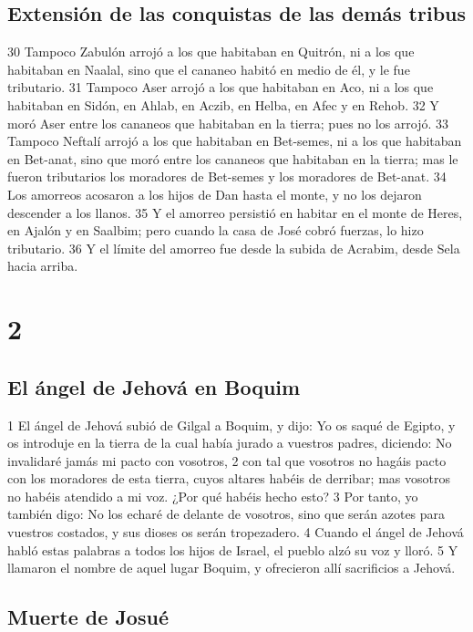 \section*{Extensión de las conquistas de las demás tribus}

30 Tampoco Zabulón arrojó a los que habitaban en Quitrón, ni a los que habitaban en Naalal, sino que el cananeo habitó en medio de él, y le fue tributario.
31 Tampoco Aser arrojó a los que habitaban en Aco, ni a los que habitaban en Sidón, en Ahlab, en Aczib, en Helba, en Afec y en Rehob.
32 Y moró Aser entre los cananeos que habitaban en la tierra; pues no los arrojó.
33 Tampoco Neftalí arrojó a los que habitaban en Bet-semes, ni a los que habitaban en Bet-anat, sino que moró entre los cananeos que habitaban en la tierra; mas le fueron tributarios los moradores de Bet-semes y los moradores de Bet-anat. 
34 Los amorreos acosaron a los hijos de Dan hasta el monte, y no los dejaron descender a los llanos.
35 Y el amorreo persistió en habitar en el monte de Heres, en Ajalón y en Saalbim; pero cuando la casa de José cobró fuerzas, lo hizo tributario.
36 Y el límite del amorreo fue desde la subida de Acrabim, desde Sela hacia arriba.

\chapter{2}

\section*{El ángel de Jehová en Boquim}

1 El ángel de Jehová subió de Gilgal a Boquim, y dijo: Yo os saqué de Egipto, y os introduje en la tierra de la cual había jurado a vuestros padres, diciendo: No invalidaré jamás mi pacto con vosotros,
2 con tal que vosotros no hagáis pacto con los moradores de esta tierra, cuyos altares habéis de derribar; mas vosotros no habéis atendido a mi voz. ¿Por qué habéis hecho esto?
3 Por tanto, yo también digo: No los echaré de delante de vosotros, sino que serán azotes para vuestros costados, y sus dioses os serán tropezadero.
4 Cuando el ángel de Jehová habló estas palabras a todos los hijos de Israel, el pueblo alzó su voz y lloró.
5 Y llamaron el nombre de aquel lugar Boquim, y ofrecieron allí sacrificios a Jehová.

\section*{Muerte de Josué }

